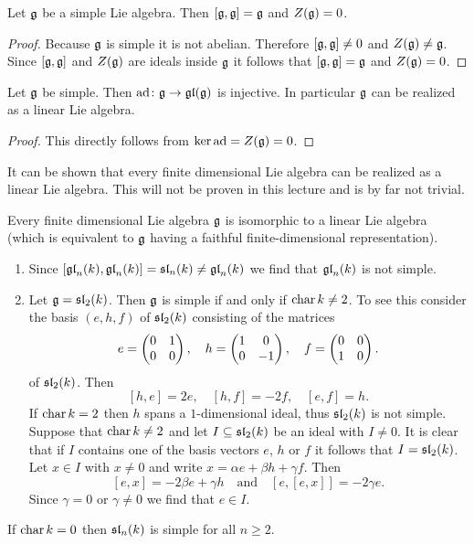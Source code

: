 \begin{lem}
 Let $\mathfrak{g}$ be a simple Lie algebra. Then $[\mathfrak{g},\mathfrak{g}] = \mathfrak{g}$ and $Z(\mathfrak{g})=0$.
\end{lem}
\begin{proof}
 Because $\mathfrak{g}$ is simple it is not abelian. Therefore $[\mathfrak{g},\mathfrak{g}] \neq 0$ and $Z(\mathfrak{g}) \neq \mathfrak{g}$. Since $[\mathfrak{g},\mathfrak{g}]$ and $Z(\mathfrak{g})$ are ideals inside $\mathfrak{g}$ it follows that $[\mathfrak{g},\mathfrak{g}] = \mathfrak{g}$ and $Z(\mathfrak{g}) = 0$.
\end{proof}


\begin{cor}
 Let $\mathfrak{g}$ be simple. Then $\operatorname{ad} \colon \mathfrak{g} \to \mathfrak{gl}(\mathfrak{g})$ is injective. In particular $\mathfrak{g}$ can be realized as a linear Lie algebra.
\end{cor}
\begin{proof}
 This directly follows from $\ker \operatorname{ad} = Z(\mathfrak{g}) = 0$.
\end{proof}


It can be shown that every finite dimensional Lie algebra can be realized as a linear Lie algebra. This will not be proven in this lecture and is by far not trivial.


\begin{thrm}[Ado]
 Every finite dimensional Lie algebra $\mathfrak{g}$ is isomorphic to a linear Lie algebra (which is equivalent to $\mathfrak{g}$ having a faithful finite-dimensional representation).
\end{thrm}


\begin{expls}
 \begin{enumerate}[leftmargin=*]
  \item
   Since $[\mathfrak{gl}_n(k),\mathfrak{gl}_n(k)] = \mathfrak{sl}_n(k) \neq \mathfrak{gl}_n(k)$ we find that $\mathfrak{gl}_n(k)$ is not simple.
  \item
   Let $\mathfrak{g} = \mathfrak{sl}_2(k)$. Then $\mathfrak{g}$ is simple if and only if $\operatorname{char} k \neq 2$. To see this consider the basis $(e,h,f)$ of $\mathfrak{sl}_2(k)$ consisting of the matrices
   \[
    e = \begin{pmatrix}0 & 1 \\ 0 & 0\end{pmatrix}, \quad
    h = \begin{pmatrix}1 & 0 \\ 0 & -1\end{pmatrix}, \quad
    f = \begin{pmatrix}0 & 0 \\ 1 & 0\end{pmatrix}.
   \]
   of $\mathfrak{sl}_2(k)$. Then
   \[
    [h,e] = 2e, \quad
    [h,f] = -2f, \quad
    [e,f] = h.
   \]
   If $\operatorname{char} k = 2$ then $h$ spans a $1$-dimensional ideal, thus $\mathfrak{sl}_2(k)$ is not simple. Suppose that $\operatorname{char} k \neq 2$ and let $I \subseteq \mathfrak{sl}_2(k)$ be an ideal with $I \neq 0$. It is clear that if $I$ contains one of the basis vectors $e$, $h$ or $f$ it follows that $I = \mathfrak{sl}_2(k)$. Let $x \in I$ with $x \neq 0$ and write $x = \alpha e + \beta h + \gamma f$. Then
   \[
    [e,x] = -2 \beta e + \gamma h \quad \text{and} \quad [e,[e,x]] = -2 \gamma e.
   \]
   Since $\gamma = 0$ or $\gamma \neq 0$ we find that $e \in I$.
 \end{enumerate}
\end{expls}


\begin{rem}
 If $\operatorname{char} k = 0$ then $\mathfrak{sl}_n(k)$ is simple for all $n \geq 2$.
\end{rem}